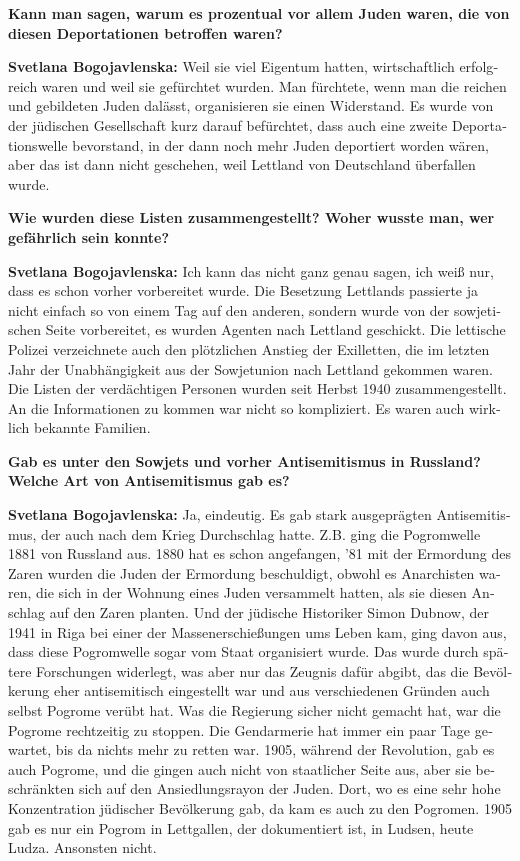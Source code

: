 \begin{otherlanguage}{ngerman}
\textbf{Kann man sagen, warum es prozentual vor allem Juden waren, die von diesen Deportationen betroffen waren?}

\textbf{Svetlana Bogojavlenska:} Weil sie viel Eigentum hatten, wirtschaftlich erfolgreich waren und weil sie gefürchtet wurden. Man fürchtete, wenn man die reichen und gebildeten Juden dalässt, organisieren sie einen Widerstand. Es wurde von der jüdischen Gesellschaft kurz darauf befürchtet, dass auch eine zweite Deportationswelle bevorstand, in der dann noch mehr Juden deportiert worden wären, aber das ist dann nicht geschehen, weil Lettland von Deutschland überfallen wurde.

\textbf{Wie wurden diese Listen zusammengestellt? Woher wusste man, wer gefährlich sein konnte?} 

\textbf{Svetlana Bogojavlenska:} Ich kann das nicht ganz genau sagen, ich weiß nur, dass es schon vorher vorbereitet wurde. Die Besetzung Lettlands passierte ja nicht einfach so von einem Tag auf den anderen, sondern wurde von der sowjetischen Seite vorbereitet, es wurden Agenten nach Lettland geschickt. Die lettische Polizei verzeichnete auch den plötzlichen Anstieg der Exilletten, die im letzten Jahr der Unabhängigkeit aus der Sowjetunion nach Lettland gekommen waren. Die Listen der verdächtigen Personen wurden seit Herbst 1940 zusammengestellt.\\
An die Informationen zu kommen war nicht so kompliziert. Es waren auch wirklich bekannte Familien.

\textbf{Gab es unter den Sowjets und vorher Antisemitismus in Russland? Welche Art von Antisemitismus gab es?}

\textbf{Svetlana Bogojavlenska:} Ja, eindeutig. Es gab stark ausgeprägten Antisemitismus, der auch nach dem Krieg Durchschlag hatte.
Z.B. ging die Pogromwelle 1881 von Russland aus. 1880 hat es schon angefangen, '81 mit der Ermordung des Zaren wurden die Juden der Ermordung beschuldigt, obwohl es Anarchisten waren, die sich in der Wohnung eines Juden versammelt hatten, als sie diesen Anschlag auf den Zaren planten. Und der jüdische Historiker Simon Dubnow, der 1941 in Riga bei einer der Massenerschießungen ums Leben kam, ging davon aus, dass diese Pogromwelle sogar vom Staat organisiert wurde. Das wurde durch spätere Forschungen widerlegt, was aber nur das Zeugnis dafür abgibt, das die Bevölkerung eher antisemitisch eingestellt war und aus verschiedenen Gründen auch selbst Pogrome verübt hat. Was die Regierung sicher nicht gemacht hat, war die Pogrome rechtzeitig zu stoppen. Die Gendarmerie hat immer ein paar Tage gewartet, bis da nichts mehr zu retten war.
1905, während der Revolution, gab es auch Pogrome, und die gingen auch nicht von staatlicher Seite aus, aber sie beschränkten sich auf den Ansiedlungsrayon der Juden. Dort, wo es eine sehr hohe Konzentration jüdischer Bevölkerung gab, da kam es auch zu den Pogromen. 1905 gab es nur ein Pogrom in Lettgallen, der dokumentiert ist, in Ludsen, heute Ludza. Ansonsten nicht. 


\end{otherlanguage}
